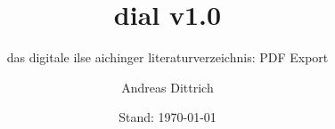 \documentclass[a4paper]{scrartcl}
\title{dial v1.0}
\subtitle{das digitale ilse aichinger literaturverzeichnis: PDF Export}
\author{Andreas Dittrich}
\date{Stand: {\today}}
\begin{document}
\maketitle
\nocite{*}
\printbibliography
\end{document}
